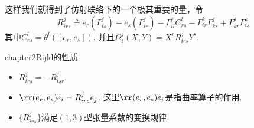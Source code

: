 这样我们就得到了仿射联络下的一个极其重要的量，令
\begin{equation}
R^{j}_{irs}\triangleq e_{r}(\Gamma^{j}_{is})-e_{s}(\Gamma^{j}_{ir})-\Gamma^{j}_{il} C^{l}_{rs}  - \Gamma^{k}_{ir}\Gamma_{ks}^{j}+\Gamma^{j}_{kr}\Gamma^{k}_{is}
\end{equation}
其中$C_{rs}^{l}=\theta^{l}\left([e_{r},e_{s}]\right) $. 并且$\Omega_{i}^{j}(X,Y)=X^{r}R^{j}_{irs}Y^{s}$.
\begin{mythm}{}{chapter2Rijkl的性质}
	\begin{itemize}
		\item[(1)] $R^{j}_{irs}=-R^{j}_{isr}$.
		\item[(2)] $\rr(e_{r},e_{s})e_{i}=R^{j}_{irs}e_{j}$. 这里$\rr(e_{r},e_{s})e_{i}$是指曲率算子的作用.
		\item[(3)] $\{R^{j}_{irs} \}$满足$(1,3)$型张量系数的变换规律.
	\end{itemize}
\end{mythm}
